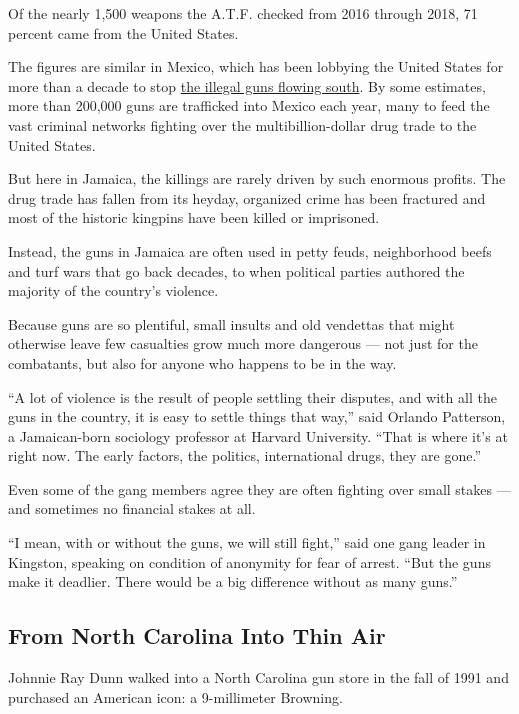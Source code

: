 Of the nearly 1,500 weapons the A.T.F. checked from 2016 through 2018,
71 percent came from the United States.

The figures are similar in Mexico, which has been lobbying the United
States for more than a decade to stop
\href{https://www.nytimes3xbfgragh.onion/2009/04/15/us/15guns.html}{the
illegal guns flowing south}. By some estimates, more than 200,000 guns
are trafficked into Mexico each year, many to feed the vast criminal
networks fighting over the multibillion-dollar drug trade to the United
States.

But here in Jamaica, the killings are rarely driven by such enormous
profits. The drug trade has fallen from its heyday, organized crime has
been fractured and most of the historic kingpins have been killed or
imprisoned.

Instead, the guns in Jamaica are often used in petty feuds, neighborhood
beefs and turf wars that go back decades, to when political parties
authored the majority of the country's violence.

Because guns are so plentiful, small insults and old vendettas that
might otherwise leave few casualties grow much more dangerous --- not
just for the combatants, but also for anyone who happens to be in the
way.

``A lot of violence is the result of people settling their disputes, and
with all the guns in the country, it is easy to settle things that
way,'' said Orlando Patterson, a Jamaican-born sociology professor at
Harvard University. ``That is where it's at right now. The early
factors, the politics, international drugs, they are gone.''

Even some of the gang members agree they are often fighting over small
stakes --- and sometimes no financial stakes at all.

``I mean, with or without the guns, we will still fight,'' said one gang
leader in Kingston, speaking on condition of anonymity for fear of
arrest. ``But the guns make it deadlier. There would be a big difference
without as many guns.''

\hypertarget{from-north-carolina-into-thin-air}{%
\subsection{From North Carolina Into Thin
Air}\label{from-north-carolina-into-thin-air}}

Johnnie Ray Dunn walked into a North Carolina gun store in the fall of
1991 and purchased an American icon: a 9-millimeter Browning.

